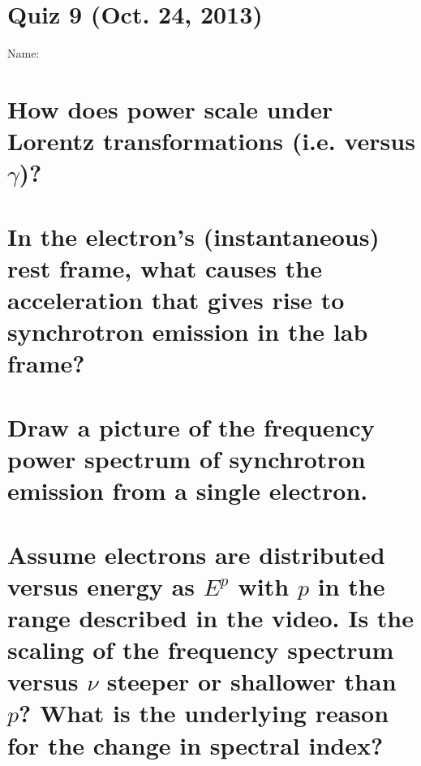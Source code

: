 \documentclass[11pt]{article}
\begin{document}
\pagestyle{empty}
\parindent=0pt

\section*{\centering Quiz 9 (Oct. 24, 2013)}

{\large
Name:\\
}

\section{How does power scale under Lorentz transformations (i.e. versus $\gamma$)?}
\vspace{1.3in}
\section{In the electron's (instantaneous) rest frame, what causes the acceleration that 
gives rise to synchrotron emission in the lab frame?}
\vspace{1.3in}
\section{Draw a picture of the frequency power spectrum of synchrotron emission from a single electron.}
\vspace{1.3in}
\section{Assume electrons are distributed versus energy as $E^p$ with $p$ in the range
described in the video.  Is the scaling of the frequency spectrum versus $\nu$ steeper
or shallower than $p$?  What is the underlying reason for the change in spectral index?}
~
\vspace{1.3in}
\end{document}
